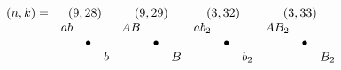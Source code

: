 \documentclass{article}
\begin{document}
\(
\begin{array}{crclrclrclrcl}
  (n,k)= & \multicolumn{3}{c}{(9,28)} & \multicolumn{3}{c}{(9,29)} & \multicolumn{3}{c}{(3,32)} & \multicolumn{3}{c}{(3,33)} \\
  & ab & & & AB & & & ab_2 & & & AB_2 & & \\
  & & \bullet & & & \bullet & & & \bullet & & & \bullet & \\
  & & & b & & & B & & & b_2& & & B_2 
\end{array}
\)\\
\end{document}
